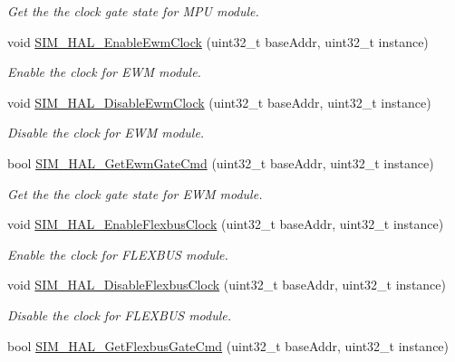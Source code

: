 \begin{DoxyCompactItemize}
\begin{DoxyCompactList}\small\item\em Get the the clock gate state for M\+PU module. \end{DoxyCompactList}\item 
void \hyperlink{group__sim__hal_gada1570ce665bc5dba4e4abd5016feac9}{S\+I\+M\+\_\+\+H\+A\+L\+\_\+\+Enable\+Ewm\+Clock} (uint32\+\_\+t base\+Addr, uint32\+\_\+t instance)
\begin{DoxyCompactList}\small\item\em Enable the clock for E\+WM module. \end{DoxyCompactList}\item 
void \hyperlink{group__sim__hal_ga6875db9cf7e63d4cb1045d01ef0621cd}{S\+I\+M\+\_\+\+H\+A\+L\+\_\+\+Disable\+Ewm\+Clock} (uint32\+\_\+t base\+Addr, uint32\+\_\+t instance)
\begin{DoxyCompactList}\small\item\em Disable the clock for E\+WM module. \end{DoxyCompactList}\item 
bool \hyperlink{group__sim__hal_ga58e8ca8c263d5147e619dfacda953be1}{S\+I\+M\+\_\+\+H\+A\+L\+\_\+\+Get\+Ewm\+Gate\+Cmd} (uint32\+\_\+t base\+Addr, uint32\+\_\+t instance)
\begin{DoxyCompactList}\small\item\em Get the the clock gate state for E\+WM module. \end{DoxyCompactList}\item 
void \hyperlink{group__sim__hal_gae635a2e162081a3b265a007efe7b1379}{S\+I\+M\+\_\+\+H\+A\+L\+\_\+\+Enable\+Flexbus\+Clock} (uint32\+\_\+t base\+Addr, uint32\+\_\+t instance)
\begin{DoxyCompactList}\small\item\em Enable the clock for F\+L\+E\+X\+B\+US module. \end{DoxyCompactList}\item 
void \hyperlink{group__sim__hal_gab100bff725c7222026d29b4f831cc123}{S\+I\+M\+\_\+\+H\+A\+L\+\_\+\+Disable\+Flexbus\+Clock} (uint32\+\_\+t base\+Addr, uint32\+\_\+t instance)
\begin{DoxyCompactList}\small\item\em Disable the clock for F\+L\+E\+X\+B\+US module. \end{DoxyCompactList}\item 
bool \hyperlink{group__sim__hal_gabdeb15de4b46befb065981f299346268}{S\+I\+M\+\_\+\+H\+A\+L\+\_\+\+Get\+Flexbus\+Gate\+Cmd} (uint32\+\_\+t base\+Addr, uint32\+\_\+t instance)

\end{DoxyCompactItemize}
